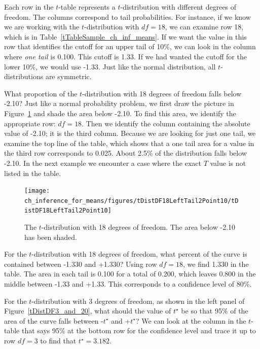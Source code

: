 Each row in the $t$-table represents a $t$-distribution with different degrees of freedom. The columns correspond to tail probabilities. For instance, if we know we are working with the $t$-distribution with $df=18$, we can examine row 18, which is  in Table~\ref{tTableSample_ch_inf_means}. If we want the value in this row that identifies the cutoff for an upper tail of 10\%, we can look in the column where \emph{one tail} is 0.100. This cutoff is 1.33. If we had wanted the cutoff for the lower 10\%, we would use -1.33. Just like the normal distribution, all $t$-distributions are symmetric.


\begin{example}{What proportion of the $t$-distribution with 18 degrees of freedom falls below -2.10?}
Just like a normal probability problem, we first draw the picture in Figure~\ref{tDistDF18LeftTail2Point10} and shade the area below -2.10. To find this area, we identify the appropriate row: $df=18$. Then we identify the column containing the absolute value of -2.10; it is the third column. Because we are looking for just one tail, we examine the top line of the table, which shows that a one tail area for a value in the third row corresponds to 0.025. About 2.5\% of the distribution falls below -2.10. In the next example we encounter a case where the exact $T$ value is not listed in the table.
\end{example}

\begin{figure}
\centering
\texttt{[image: ch\_inference\_for\_means/figures/tDistDF18LeftTail2Point10/tDistDF18LeftTail2Point10]}
\caption{The $t$-distribution with 18 degrees of freedom. The area below -2.10 has been shaded.}
\label{tDistDF18LeftTail2Point10}
\end{figure}

\textA{\newpage}

\begin{example}{For the $t$-distribution with 18 degrees of freedom, what percent of the curve is contained between -1.330 and +1.330?}
Using row $df = 18$, we find 1.330 in the table. The area in each tail is 0.100 for a total of 0.200, which leaves 0.800 in the middle between -1.33 and +1.33. This corresponds to a confidence level of 80\%.
\end{example}

\begin{example}{For the $t$-distribution with 3 degrees of freedom, as shown in the left panel of Figure~\ref{tDistDF3_and_20}, what should the value of $t^{\star}$ be so that 95\% of the area of the curve falls between -$t^{\star}$ and +$t^{\star}$?}
We can look at the column in the $t$-table that says 95\% at the bottom row for the confidence level and trace it up to row $df = 3$ to find that $t^{\star} = 3.182$.
\end{example}

